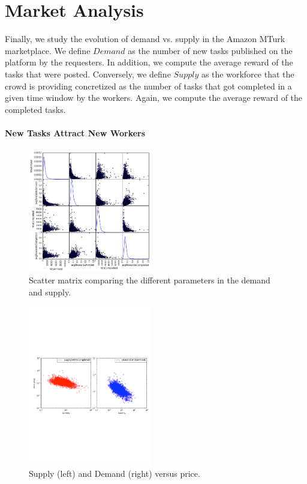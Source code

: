 \section{Market Analysis}
\label{sec:market}
Finally, we study the evolution of demand vs. supply in the Amazon MTurk marketplace. We define $Demand$ as the number of new tasks published on the platform by the requesters. In addition, we compute the average reward of the tasks that were posted. Conversely, we define $Supply$ as the workforce that the crowd is providing concretized as the number of tasks that got completed in a given time window by the workers. Again, we compute the average reward of the completed tasks.


\paragraph{New Tasks Attract New Workers}
\begin{figure}[tb]
	\centering
		\includegraphics[width=0.48\textwidth]{figures/scattermatrix}
	\caption{Scatter matrix comparing the different parameters in the demand and supply.}
	\label{fig:scatter_matrix}
\end{figure}
\begin{figure}[tb]
	\centering
		\includegraphics[width=0.48\textwidth]{figures/supply_demand}
	\caption{Supply (left) and Demand (right) versus price.}
	\label{fig:dsup}
\end{figure}
